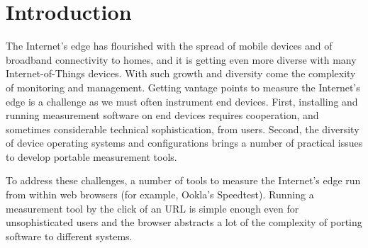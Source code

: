 \documentclass[12pt,twoside]{book}
\begin{document}
\tableofcontents
\newpage


%

\chapter{Introduction}


The Internet's edge has flourished with the spread of mobile devices and of broadband connectivity to homes, and it is getting even more diverse with many Internet-of-Things devices. With such growth and diversity come the complexity of monitoring and management. Getting vantage points to measure the Internet's edge is a challenge as we must often instrument end devices. First, installing and running measurement software on end devices requires cooperation, and sometimes considerable technical sophistication, from users. Second, the diversity of device operating systems and configurations brings a number of practical issues to develop portable measurement tools.

To address these challenges, a number of tools to measure the Internet's edge run from within web browsers (for example, Ookla's Speedtest). Running a measurement tool by the  click of an URL is simple enough even for unsophisticated users and the browser abstracts  a lot of the complexity of  porting software to different systems.

\end{document}
